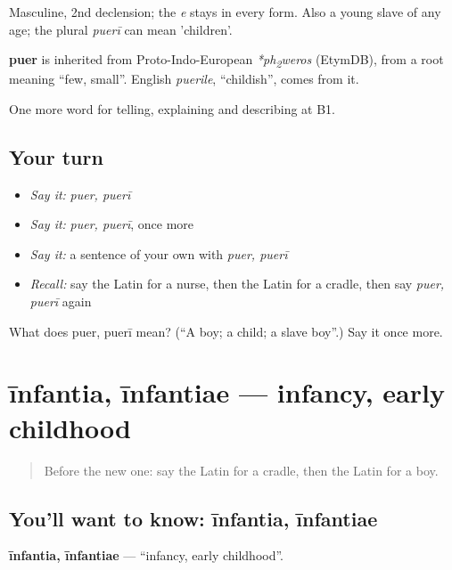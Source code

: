 Masculine, 2nd declension; the \emph{e} stays in every form. Also a young slave of any age; the plural \emph{puerī} can mean 'children'.

\begin{cousinweb}
\textbf{puer} is inherited from Proto-Indo-European \emph{*ph\textsubscript{2}weros} (EtymDB), from a root meaning \textquotedblleft{}few, small\textquotedblright{}. English \emph{puerile}, \textquotedblleft{}childish\textquotedblright{}, comes from it.
\end{cousinweb}

\begin{grammarlens}[title={What you've built}]
One more word for telling, explaining and describing at B1.
\end{grammarlens}

\subsection*{Your turn}
\begin{itemize}
\raggedright
  \item \emph{Say it:} \emph{puer, puerī}
  \item \emph{Say it:} \emph{puer, puerī}, once more
  \item \emph{Say it:} a sentence of your own with \emph{puer, puerī}
  \item \emph{Recall:} say the Latin for a nurse, then the Latin for a cradle, then say \emph{puer, puerī} again
\end{itemize}

\begin{tcolorbox}[breakable,colback=teal!4,colframe=teal!35!black,title={Before you move on}]
What does puer, puerī mean? (\textquotedblleft{}A boy; a child; a slave boy\textquotedblright{}.) Say it once more.
\end{tcolorbox}
\section[īnfantia, īnfantiae]{īnfantia, īnfantiae — infancy, early childhood}

\label{lesson:LA-C324-infantia}



\begin{quote}
Before the new one: say the Latin for a cradle, then the Latin for a boy.
\end{quote}

\subsection*{You'll want to know: īnfantia, īnfantiae}
\textbf{īnfantia, īnfantiae} — \textquotedblleft{}infancy, early childhood\textquotedblright{}.

